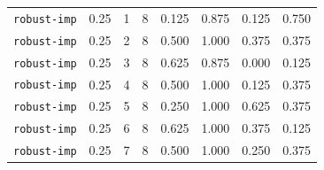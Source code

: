 \documentclass{article}
\begin{document}
\begin{center}
{\begin{tabular}{llllcccc}
\texttt{robust-imp} & 0.25 & 1 & 8 & 0.125 & 0.875 & 0.125 & 0.750 \\
\texttt{robust-imp} & 0.25 & 2 & 8 & 0.500 & 1.000 & 0.375 & 0.375 \\
\texttt{robust-imp} & 0.25 & 3 & 8 & 0.625 & 0.875 & 0.000 & 0.125 \\
\texttt{robust-imp} & 0.25 & 4 & 8 & 0.500 & 1.000 & 0.125 & 0.375 \\
\texttt{robust-imp} & 0.25 & 5 & 8 & 0.250 & 1.000 & 0.625 & 0.375 \\
\texttt{robust-imp} & 0.25 & 6 & 8 & 0.625 & 1.000 & 0.375 & 0.125 \\
\texttt{robust-imp} & 0.25 & 7 & 8 & 0.500 & 1.000 & 0.250 & 0.375 \\
\bottomrule
\end{tabular}%
}
\end{center}
\normalsize



\end{document}
